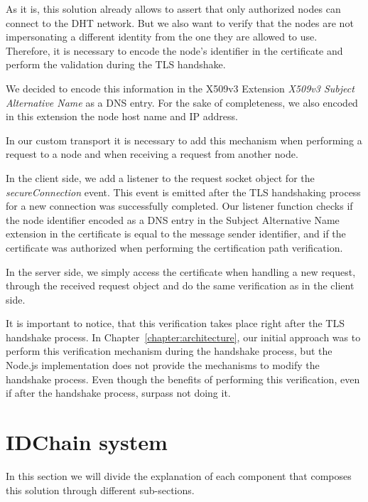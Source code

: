 

As it is, this solution already allows to assert that only authorized nodes can connect to the DHT network.
But we also want to verify that the nodes are not impersonating a different identity from the one they are allowed to use.
Therefore, it is necessary to encode the node's identifier in the certificate and perform the validation during the TLS handshake.

We decided to encode this information in the X509v3 Extension \textit{X509v3 Subject Alternative Name} as a DNS entry.
For the sake of completeness, we also encoded in this extension the node host name and IP address.

In our custom transport it is necessary to add this mechanism when performing a request to a node and when receiving a request from another node.

In the client side, we add a listener to the request socket object for the \textit{secureConnection} event.
This event is emitted after the TLS handshaking process for a new connection was successfully completed.
Our listener function checks if the node identifier encoded as a DNS entry in the Subject Alternative Name extension in the certificate is equal to the message sender identifier, and if the certificate was authorized when performing the certification path verification.

In the server side, we simply access the certificate when handling a new request, through the received request object and do the same verification as in the client side.

It is important to notice, that this verification takes place right after the TLS handshake process.
In Chapter~\ref{chapter:architecture}, our initial approach was to perform this verification mechanism during the handshake process, but the Node.js implementation does not provide the mechanisms to modify the handshake process.
Even though the benefits of performing this verification, even if after the handshake process, surpass not doing it.

\section{IDChain system}\label{implementation:idchain}

In this section we will divide the explanation of each component that composes this solution through different sub-sections.

